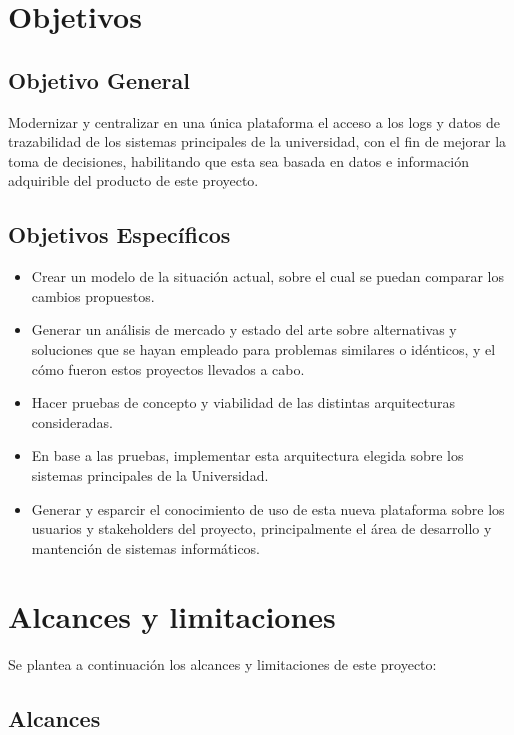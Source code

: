 \clearpage

\section{Objetivos}
\subsection{Objetivo General}

Modernizar y centralizar en una única plataforma el acceso a los logs y datos de trazabilidad de los sistemas principales de la universidad, con el fin de mejorar la toma de decisiones, habilitando que esta sea basada en datos e información adquirible del producto de este proyecto.

\subsection{Objetivos Específicos}

\begin{itemize}
	\item Crear un modelo de la situación actual, sobre el cual se puedan comparar los cambios propuestos.
	\item Generar un análisis de mercado y estado del arte sobre alternativas y soluciones que se hayan empleado para problemas similares o idénticos, y el cómo fueron estos proyectos llevados a cabo.
	\item Hacer pruebas de concepto y viabilidad de las distintas arquitecturas consideradas.
	\item En base a las pruebas, implementar esta arquitectura elegida sobre los sistemas principales de la Universidad.
	\item Generar y esparcir el conocimiento de uso de esta nueva plataforma sobre los usuarios y stakeholders del proyecto, principalmente el área de desarrollo y mantención de sistemas informáticos.
\end{itemize}

\clearpage

\section{Alcances y limitaciones}

Se plantea a continuación los alcances y limitaciones de este proyecto:

\subsection{Alcances}

